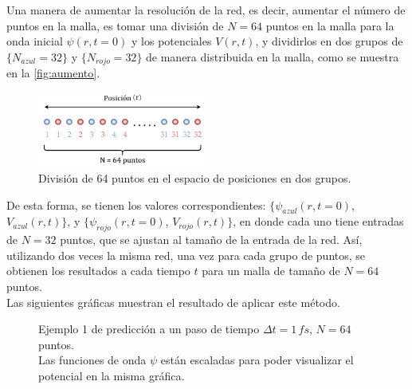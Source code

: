 Una manera de aumentar la resolución de la red, es decir, aumentar el número de puntos en la malla, es tomar una división de $N=64$ puntos en la malla para la onda inicial $\psi(r,t=0)$ y los potenciales $V(r,t)$, y dividirlos en dos grupos de $\{N_{azul}=32\}$ y $\{N_{rojo}=32\}$ de manera distribuida en la malla, como se muestra en la \autoref{fig:aumento}. 

\begin{figure}[H]
  \centering
  \includegraphics[width=0.5\textwidth]{./img/aumento.drawio.png}
  \caption{División de 64 puntos en el espacio de posiciones en dos grupos.}
  \label{fig:aumento}
\end{figure}

De esta forma, se tienen los valores correspondientes: $\{\psi_{azul}(r,t=0)$, $V_{azul}(r,t)\}$, y $\{\psi_{rojo}(r,t=0)$, $V_{rojo}(r,t)\}$, en donde cada uno tiene entradas de $N=32$ puntos, que se ajustan al tamaño de la entrada de la red. Así, utilizando dos veces la misma red, una vez para cada grupo de puntos, se obtienen los resultados a cada tiempo $t$ para un malla de tamaño de $N=64$ puntos.
\\
Las siguientes gráficas muestran el resultado de aplicar este método.

\begin{figure}[H]
  \centering
  \caption{Ejemplo 1 de predicción a un paso de tiempo $\Delta t = 1\,fs$, $N=64$ puntos.\\ Las funciones de onda $\psi$ están escaladas para poder visualizar el potencial en la misma gráfica.}
  \label{fig:1step164}
\end{figure}

